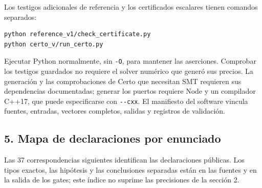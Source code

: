 \documentclass[spanish,11pt,a4paper]{article}
\begin{document}
Los testigos adicionales de referencia y los certificados escalares
tienen comandos separados:

\begin{verbatim}
python reference_v1/check_certificate.py
python certo_v/run_certo.py
\end{verbatim}

Ejecutar Python normalmente, sin \texttt{-O}, para mantener las
aserciones. Comprobar los testigos guardados no requiere el solver
numérico que generó sus precios. La generación y las comprobaciones de
Certo que necesitan SMT requieren sus dependencias documentadas; generar
los puertos requiere Node y un compilador C++17, que puede especificarse
con \texttt{-\/-cxx}. El manifiesto del software vincula fuentes,
entradas, vectores completos, salidas y registros de validación.

\subsection{5. Mapa de declaraciones por
enunciado}\label{mapa-de-declaraciones-por-enunciado}

Las 37 correspondencias siguientes identifican las declaraciones
públicas. Los tipos exactos, las hipótesis y las conclusiones separadas
están en las fuentes y en la salida de los gates; este índice no suprime
las precisiones de la sección 2.
\end{document}
